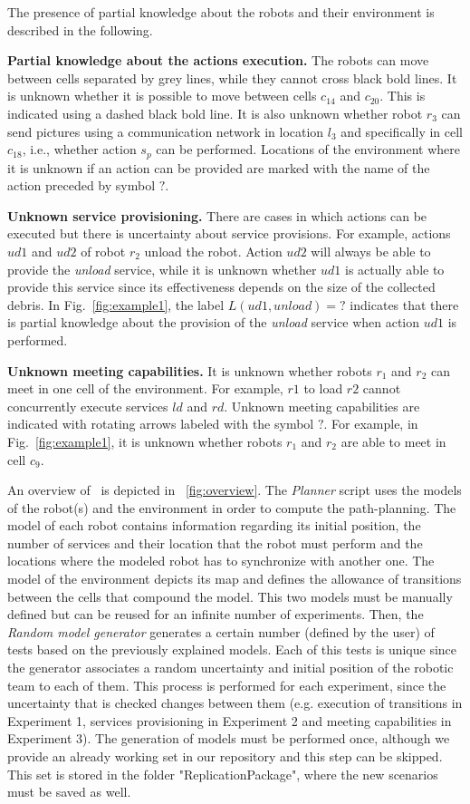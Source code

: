The presence of partial knowledge about the robots and their environment is described in the following.

\textbf{Partial knowledge about the actions execution.} 
The robots can move between cells separated by grey lines, while they cannot cross black bold lines.
It is unknown whether it is possible to move between cells $c_{14}$ and $c_{20}$.
This is indicated using a dashed black bold line.
It is also unknown whether robot $r_3$ can send pictures using a communication network in location $l_3$ and specifically in cell $c_{18}$, i.e., whether action $s_p$ can be performed. 
Locations of the environment where it is unknown if an action can be provided are marked with the name of the action preceded by symbol $?$.

\textbf{Unknown service provisioning.} 
There are cases in which actions can be executed but there is uncertainty about service provisions.
For example, actions $ud1$ and $ud2$ of robot $r_2$ unload the robot.
Action $ud2$ will always be able to provide the \emph{unload} service, while it is unknown whether $ud1$ is actually able to provide this service since its effectiveness depends on the size of the collected debris. 
In Fig.~\ref{fig:example1}, the label $L(ud1,unload)=?$ indicates that there is partial knowledge about the provision of the \emph{unload} service when action $ud1$ is performed. 

\textbf{Unknown meeting capabilities.} 
It is  unknown whether robots $r_1$ and $r_2$ can meet in one cell of the environment. 
For example,  $r1$ to load $r2$ cannot concurrently execute services $ld$ and $rd$. 
Unknown meeting capabilities are indicated with rotating arrows labeled with the symbol $?$.
For example,  in Fig.~\ref{fig:example1}, it is unknown whether robots $r_1$ and $r_2$ are able to meet in cell $c_{9}$.

An overview of \toolName\ is depicted in ~\ref{fig:overview}.
The \emph{Planner} script uses the models of the robot(s) and the environment in order to compute the path-planning.
The model of each robot contains information regarding its initial position, the number of services and their location that the robot must perform and the locations where the modeled robot has to synchronize with another one.  
The model of the environment depicts its map and defines the allowance of transitions between the cells that compound the model.
This two models must be manually defined but can be reused for an infinite number of experiments.
Then, the \emph{Random model generator} generates a certain number (defined by the user) of tests based on the previously explained models.
Each of this tests is unique since the generator associates a random uncertainty and initial position of the robotic team to each of them.
This process is performed for each experiment, since the uncertainty that is checked changes between them (e.g. execution of transitions in Experiment 1, services provisioning in Experiment 2 and meeting capabilities in Experiment 3).
The generation of models must be performed once, although we provide an already working set in our repository and this step can be skipped.
This set is stored in the folder "ReplicationPackage", where the new scenarios must be saved as well.

